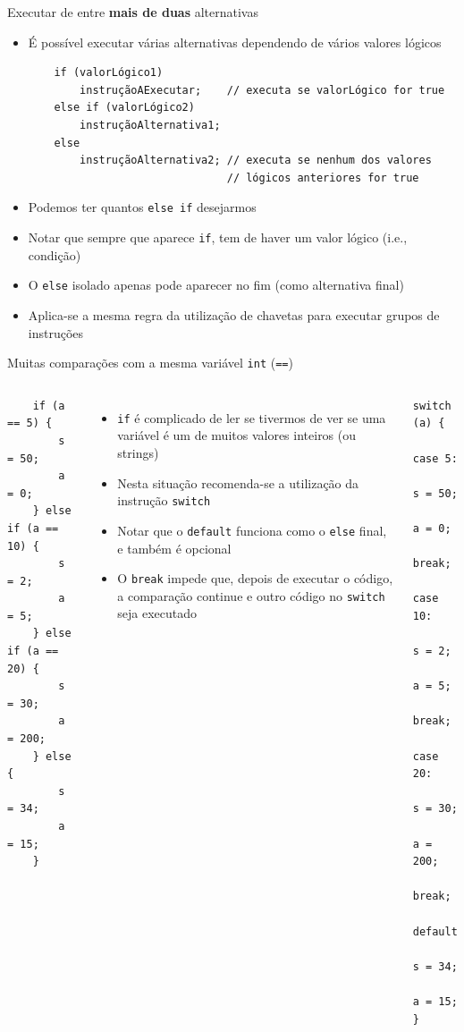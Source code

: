 \documentclass[portuguese, aspectratio=169, xcolor=table]{beamer}
\begin{document}
\begin{frame}[fragile]{Executar de entre \textbf{mais de duas} alternativas}
\begin{itemize}
\item É possível executar várias alternativas dependendo de vários valores lógicos
\begin{verbatim}
    if (valorLógico1)
        instruçãoAExecutar;    // executa se valorLógico for true
    else if (valorLógico2)
        instruçãoAlternativa1;
    else
        instruçãoAlternativa2; // executa se nenhum dos valores
                               // lógicos anteriores for true
\end{verbatim}
\item Podemos ter quantos \texttt{else if} desejarmos
\item Notar que sempre que aparece \texttt{if}, tem de haver um valor lógico (i.e., condição)
\item O \texttt{else} isolado apenas pode aparecer no fim (como alternativa final)
\item Aplica-se a mesma regra da utilização de chavetas para executar grupos de instruções
\end{itemize}
\end{frame}


\begin{frame}[fragile]{Muitas comparações com a mesma variável \texttt{int} (\texttt{==})}
\begin{columns}[t]

\begin{verbatim}
    if (a == 5) {
        s = 50;
        a = 0;
    } else if (a == 10) {
        s = 2;
        a = 5;
    } else if (a == 20) {
        s = 30;
        a = 200;
    } else {
        s = 34;
        a = 15;
    }
\end{verbatim}
\begin{itemize}
    \item \texttt{if} é complicado de ler se tivermos de ver se uma variável é um de muitos valores inteiros (ou strings)
    \item Nesta situação recomenda-se a utilização da instrução \texttt{switch}
    \item Notar que o \texttt{default} funciona como o \texttt{else} final, e também é opcional
    \item O \texttt{break} impede que, depois de executar o código, a comparação continue e outro código no \texttt{switch} seja executado
\end{itemize}
\begin{verbatim}
switch (a) {
    case 5:
        s = 50;
        a = 0;
        break;
    case 10:
        s = 2;
        a = 5;
        break;
    case 20:
        s = 30;
        a = 200;
        break;
    default:
        s = 34;
        a = 15;
}
\end{verbatim}
\end{columns}
\end{frame}
\end{document}
